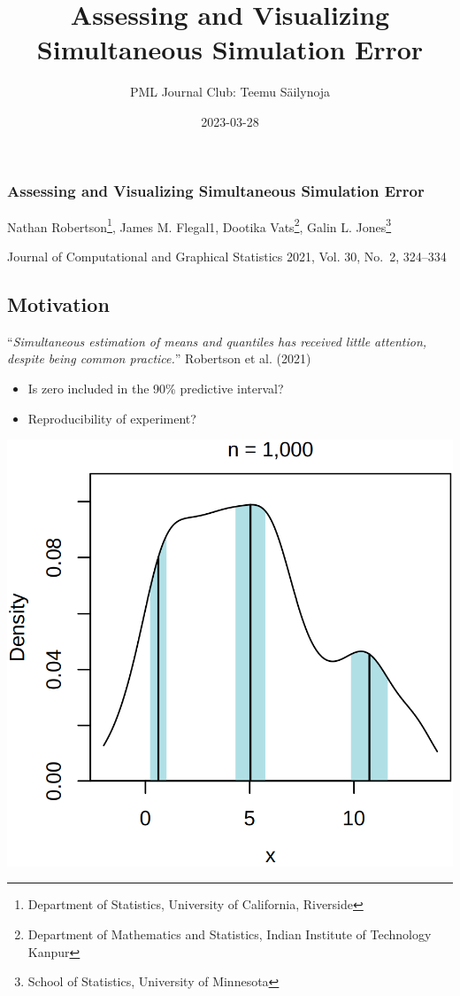 \documentclass[
  letterpaper,
  DIV=11,
  numbers=noendperiod]{scrartcl}
\title{Assessing and Visualizing Simultaneous Simulation Error}
\subtitle{PML Journal Club: Teemu Säilynoja}
\author{}
\date{2023-03-28}
\providecommand{\tightlist}{%
  \setlength{\itemsep}{0pt}\setlength{\parskip}{0pt}}\usepackage{longtable,booktabs,array}
\begin{document}
\maketitle
\ifdefined\Shaded\renewenvironment{Shaded}{\begin{tcolorbox}[sharp corners, boxrule=0pt, enhanced, interior hidden, breakable, frame hidden, borderline west={3pt}{0pt}{shadecolor}]}{\end{tcolorbox}}\fi

\hypertarget{assessing-and-visualizing-simultaneous-simulation-error}{%
\subsubsection{Assessing and Visualizing Simultaneous Simulation
Error}\label{assessing-and-visualizing-simultaneous-simulation-error}}

Nathan Robertson\footnote{Department of Statistics, University of
  California, Riverside}, James M. Flegal1, Dootika Vats\footnote{Department
  of Mathematics and Statistics, Indian Institute of Technology Kanpur},
Galin L. Jones\footnote{School of Statistics, University of Minnesota}

Journal of Computational and Graphical Statistics 2021, Vol. 30, No.~2,
324--334

\hypertarget{motivation}{%
\subsection{Motivation}\label{motivation}}

``\emph{Simultaneous estimation of means and quantiles has received
little attention, despite being common practice.}'' Robertson et al.
(2021)

\begin{itemize}
\tightlist
\item
  Is zero included in the 90\% predictive interval?
\item
  Reproducibility of experiment?
\end{itemize}

\includegraphics{mixture1.png}
\end{document}
